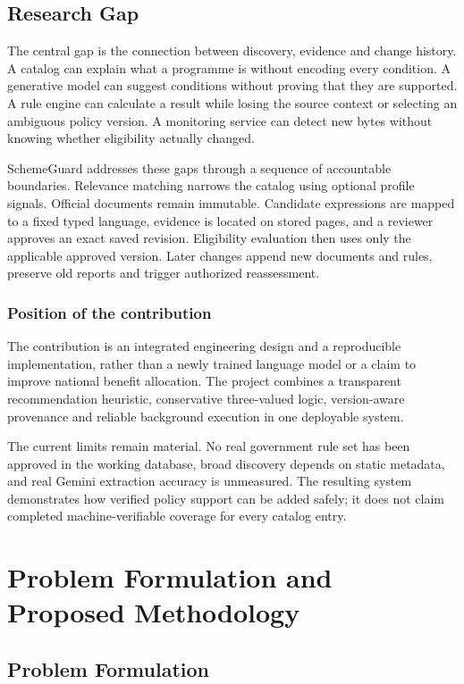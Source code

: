 \documentclass[12pt,a4paper,twoside]{report}
\begin{document}
\section{Research Gap}

The central gap is the connection between discovery, evidence and change history. A catalog can explain what a programme is without encoding every condition. A generative model can suggest conditions without proving that they are supported. A rule engine can calculate a result while losing the source context or selecting an ambiguous policy version. A monitoring service can detect new bytes without knowing whether eligibility actually changed.

SchemeGuard addresses these gaps through a sequence of accountable boundaries. Relevance matching narrows the catalog using optional profile signals. Official documents remain immutable. Candidate expressions are mapped to a fixed typed language, evidence is located on stored pages, and a reviewer approves an exact saved revision. Eligibility evaluation then uses only the applicable approved version. Later changes append new documents and rules, preserve old reports and trigger authorized reassessment.

\subsection*{Position of the contribution}

The contribution is an integrated engineering design and a reproducible implementation, rather than a newly trained language model or a claim to improve national benefit allocation. The project combines a transparent recommendation heuristic, conservative three-valued logic, version-aware provenance and reliable background execution in one deployable system.

The current limits remain material. No real government rule set has been approved in the working database, broad discovery depends on static metadata, and real Gemini extraction accuracy is unmeasured. The resulting system demonstrates how verified policy support can be added safely; it does not claim completed machine-verifiable coverage for every catalog entry.

\clearpage\chapter{Problem Formulation and Proposed Methodology}

\section{Problem Formulation}
\end{document}
